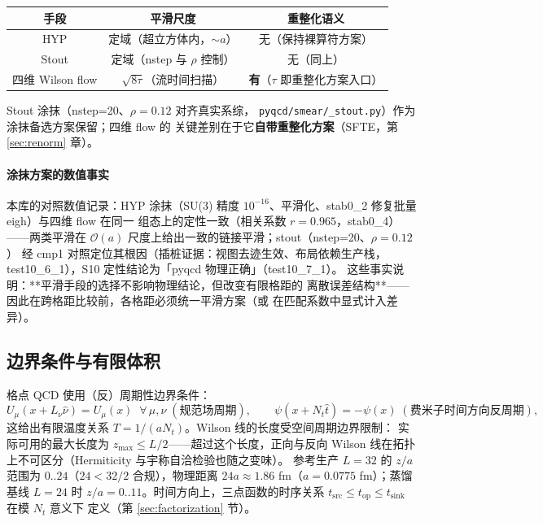 \documentclass[11pt,a4paper]{ctexart}
\newcommand{\order}[1]{\mathcal{O}(#1)}
\newcommand{\code}[1]{\texttt{#1}}
\begin{document}
\begin{center}
\small
\begin{tabular}{c c c}
\toprule
\textbf{手段} & \textbf{平滑尺度} & \textbf{重整化语义} \\
\midrule
HYP & 定域（超立方体内，$\sim a$） & 无（保持裸算符方案） \\
Stout & 定域（nstep 与 $\rho$ 控制） & 无（同上） \\
四维 Wilson flow & $\sqrt{8\tau}$（流时间扫描） & \textbf{有}（$\tau$ 即重整化方案入口） \\
\bottomrule
\end{tabular}
\end{center}
Stout 涂抹（nstep=20、$\rho=0.12$ 对齐真实系综，
\code{pyqcd/smear/\_stout.py}）作为涂抹备选方案保留；四维 flow 的
关键差别在于它\textbf{自带重整化方案}（SFTE，第 \ref{sec:renorm} 章）。

\paragraph{涂抹方案的数值事实}本库的对照数值记录：HYP 涂抹（SU(3)
精度 $10^{-16}$、平滑化、stab0\_2 修复批量 eigh）与四维 flow 在同一
组态上的定性一致（相关系数 $r=0.965$，stab0\_4）——两类平滑在
$\order{a}$ 尺度上给出一致的链接平滑；stout（nstep=20、$\rho=0.12$）
经 cmp1 对照定位其根因（插桩证据：视图去迹生效、布局依赖生产栈，
test10\_6\_1），S10 定性结论为「pyqcd 物理正确」（test10\_7\_1）。
这些事实说明：**平滑手段的选择不影响物理结论，但改变有限格距的
离散误差结构**——因此在跨格距比较前，各格距必须统一平滑方案（或
在匹配系数中显式计入差异）。

\subsection{边界条件与有限体积}

格点 QCD 使用（反）周期性边界条件：
\begin{equation}
U_\mu(x+L_\nu\hat\nu)=U_\mu(x)\;\;\forall\,\mu,\nu\;(\text{规范场周期}),
\qquad \psi(x+N_t\hat t)=-\psi(x)\;(\text{费米子时间方向反周期}),
\end{equation}
这给出有限温度关系 $T=1/(aN_t)$。Wilson 线的长度受空间周期边界限制：
实际可用的最大长度为 $z_{\max}\le L/2$——超过这个长度，正向与反向
Wilson 线在拓扑上不可区分（Hermiticity 与宇称自洽检验也随之变味）。
参考生产 $L=32$ 的 $z/a$ 范围为 $0..24$（$24<32/2$ 合规），物理距离
$24a\approx1.86$ fm（$a=0.0775$ fm）；蒸馏基线 $L=24$ 时
$z/a=0..11$。时间方向上，三点函数的时序关系
$t_{\text{src}}\le t_{\text{op}}\le t_{\text{sink}}$ 在模 $N_t$ 意义下
定义（第 \ref{sec:factorization} 节）。
\end{document}
